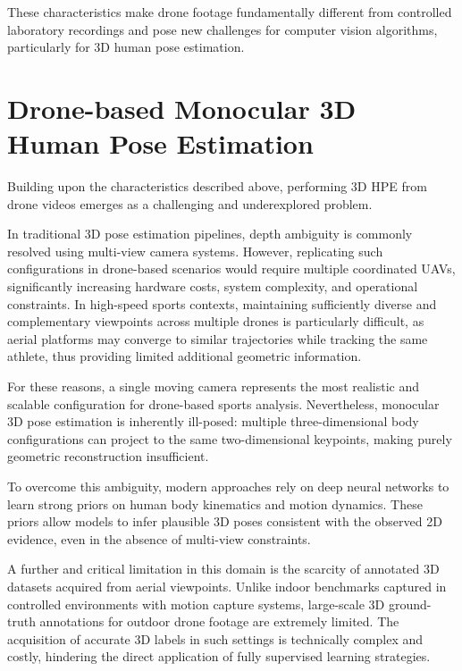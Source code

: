 These characteristics make drone footage fundamentally different from controlled laboratory recordings and pose new challenges for computer vision algorithms, particularly for 3D human pose estimation.


\section{Drone-based Monocular 3D Human Pose Estimation}

Building upon the characteristics described above, performing 3D HPE from drone videos emerges as a challenging and underexplored problem.

In traditional 3D pose estimation pipelines, depth ambiguity is commonly resolved using multi-view camera systems. However, replicating such configurations in drone-based scenarios would require multiple coordinated UAVs, significantly 
increasing hardware costs, system complexity, and operational constraints. In high-speed sports contexts, maintaining sufficiently diverse and complementary viewpoints across multiple drones is particularly difficult, as aerial 
platforms may converge to similar trajectories while tracking the same athlete, thus providing limited additional geometric information.

For these reasons, a single moving camera represents the most realistic and scalable configuration for drone-based sports analysis. Nevertheless, monocular 3D pose estimation is inherently ill-posed: multiple three-dimensional body 
configurations can project to the same two-dimensional keypoints, making purely geometric reconstruction insufficient.

To overcome this ambiguity, modern approaches rely on deep neural networks to learn strong priors on human body kinematics and motion dynamics. These priors allow models to infer plausible 3D poses consistent with the observed 2D 
evidence, even in the absence of multi-view constraints.

A further and critical limitation in this domain is the scarcity of annotated 3D datasets acquired from aerial viewpoints. Unlike indoor benchmarks captured in controlled environments with motion capture systems, large-scale 3D 
ground-truth annotations for outdoor drone footage are extremely limited. The acquisition of accurate 3D labels in such settings is technically complex and costly, hindering the direct application of fully supervised learning strategies.

